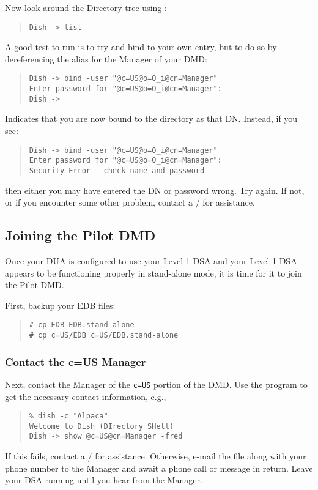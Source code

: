 Now look around the Directory tree using :
\begin{quote}\small\begin{verbatim}
Dish -> list
\end{verbatim}\end{quote}
A good test to run is to try and bind to your own entry,
but to do so by dereferencing the alias for the Manager of your DMD:
\begin{quote}\small\begin{verbatim}
Dish -> bind -user "@c=US@o=O_i@cn=Manager"
Enter password for "@c=US@o=O_i@cn=Manager": 
Dish -> 
\end{verbatim}\end{quote}
Indicates that you are now bound to the directory as that DN.
Instead, if you see:
\begin{quote}\small\begin{verbatim}
Dish -> bind -user "@c=US@o=O_i@cn=Manager"
Enter password for "@c=US@o=O_i@cn=Manager": 
Security Error - check name and password
\end{verbatim}\end{quote}
then either you may have entered the DN or password wrong.
Try again.
If not,
or if you encounter some other problem,
contact a \camayoc/ for assistance.

\subsection	{Joining the Pilot DMD}
Once your DUA is configured to use your Level-1 DSA and your Level-1 DSA
appears to be functioning properly in stand-alone mode,
it is time for it to join the Pilot DMD.

First,
backup your EDB files:
\begin{quote}\small\begin{verbatim}
# cp EDB EDB.stand-alone
# cp c=US/EDB c=US/EDB.stand-alone
\end{verbatim}\end{quote}

\subsubsection	{Contact the c=US Manager}
Next,
contact the Manager of the \verb"c=US" portion of the DMD.
Use the  program to get the necessary contact information, e.g.,
\begin{quote}\small\begin{verbatim}
% dish -c "Alpaca"
Welcome to Dish (DIrectory SHell)
Dish -> show @c=US@cn=Manager -fred
\end{verbatim}\end{quote}
If this fails,
contact a \camayoc/ for assistance.
Otherwise, e-mail the file  along with your phone number to the
Manager and await a phone call or message in return.
Leave your DSA running until you hear from the Manager.

